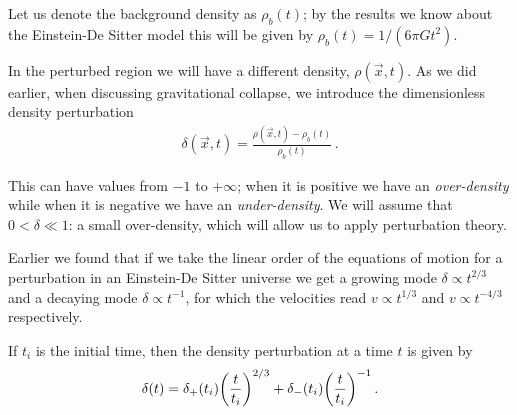 \documentclass[main.tex]{subfiles}
\begin{document}

Let us denote the background density as \(\rho _b (t)\); by the results we know about the Einstein-De Sitter model this will be given by \(\rho _b (t) = 1 / (6 \pi G t^2)\).

In the perturbed region we will have a different density, \(\rho (\vec{x},t)\). As we did earlier, when discussing gravitational collapse, we introduce the dimensionless density perturbation
%
\begin{align}
\delta (\vec{x}, t) = \frac{\rho (\vec{x}, t) - \rho_b (t)}{\rho_b(t)} 
\,.
\end{align}

This can have values from \(-1\) to \(+ \infty\); when it is positive we have an \emph{over-density} while when it is negative we have an \emph{under-density}. 
We will assume that \(0< \delta \ll 1\): a small over-density, which will allow us to apply perturbation theory.




Earlier we found that if we take the linear order of the equations of motion for a perturbation in an Einstein-De Sitter universe we get a growing mode \(\delta \propto t^{2/3}\) and a decaying mode \(\delta \propto t^{-1}\), for which the velocities read \(v \propto t^{1/3} \) and \(v \propto t^{-4/3}\) respectively. 

If \(t_i\) is the initial time, then the density perturbation at a time \(t\) is given by
%
\begin{align}
\delta (t) = \delta_+ (t_i) \qty(\frac{t}{t_i})^{2/3}
+ \delta_- (t_i) \qty(\frac{t}{t_i})^{-1}
\,.
\end{align}
\end{document}

